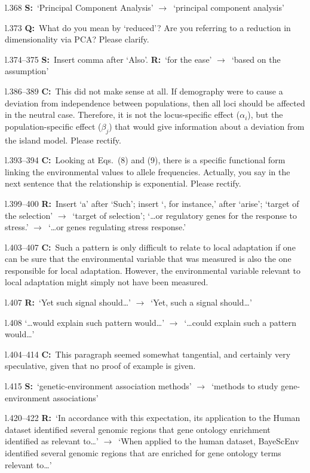 \documentclass[11pt]{article}
\newenvironment{my_description}
{\begin{description}
  \setlength{\itemsep}{2pt}
  \setlength{\parskip}{0pt}
  \setlength{\parsep}{0pt}}
{\end{description}}
\newcommand{\ra}{$\rightarrow$\ }
\newcommand{\C}{\textbf{C:}\ }
\newcommand{\Q}{\textbf{Q:}\ }
\newcommand{\R}{\textbf{R:}\ }
\newcommand{\V}{\textbf{S:}\ }
\begin{document}
\begin{my_description}
	\item[l.368] \V `Principal Component Analysis' \ra `principal component analysis'
	\item[l.373] \Q What do you mean by `reduced'? Are you referring to a reduction in dimensionality via PCA? Please clarify.
	\item[l.374--375] \V Insert comma after `Also'. \R `for the ease' \ra `based on the assumption'
	\item[l.386--389] \C This did not make sense at all. If demography were to cause a deviation from independence between populations, then all loci should be affected in the neutral case. Therefore, it is not the locus-specific effect ($\alpha_i$), but the population-specific effect ($\beta_j$) that would give information about a deviation from the island model. Please rectify.
	\item[l.393--394] \C Looking at Eqs.\ (8) and (9), there is a specific functional form linking the environmental values to allele frequencies. Actually, you say in the next sentence that the relationship is exponential. Please rectify.
	\item[l.399--400] \R Insert `a' after `Such'; insert `, for instance,' after `arise'; `target of the selection' \ra `target of selection'; `\dots or regulatory genes for the response to stress.' \ra `\dots or genes regulating stress response.'
	\item[l.403--407] \C Such a pattern is only difficult to relate to local adaptation if one can be sure that the environmental variable that was measured is also the one responsible for local adaptation. However, the environmental variable relevant to local adaptation might simply not have been measured.
	\item[l.407] \R `Yet such signal should\dots' \ra `Yet, such a signal should\dots'
	\item[l.408] `\dots would explain such pattern would\dots' \ra `\dots could explain such a pattern would\dots'
	\item[l.404--414] \C This paragraph seemed somewhat tangential, and certainly very speculative, given that no proof of example is given.
	\item[l.415] \V `genetic-environment association methods' \ra `methods to study gene-environment associations'
	\item[l.420--422] \R `In accordance with this expectation, its application to the Human dataset identified several genomic regions that gene ontology enrichment identified as relevant to\dots' \ra `When applied to the human dataset, BayeScEnv identified several genomic regions that are enriched for gene ontology terms relevant to\dots'

\end{my_description}
\end{document}
